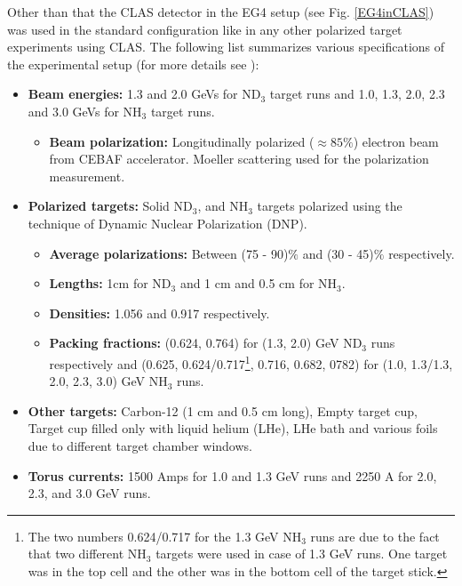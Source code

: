 Other than that the CLAS detector in the EG4 setup (see Fig. \ref{EG4inCLAS}) was used in the standard configuration like in any other polarized target experiments using CLAS. The following list summarizes various specifications of the experimental setup (for more details see \cite{anaNoteXZheng}):
\begin{itemize}
\item \textbf{Beam energies:} 1.3 and 2.0 GeVs for ND$_3$ target runs and 1.0, 1.3, 2.0, 2.3 and 3.0 GeVs for NH$_3$ target runs.
\begin{itemize}
\item \textbf{Beam polarization: } Longitudinally polarized ($\approx 85\%$) electron beam from CEBAF accelerator. Moeller scattering used for the polarization measurement.
\end{itemize}
\item \textbf{Polarized targets: } Solid ND$_3$, and NH$_3$ targets polarized using the technique of Dynamic Nuclear Polarization (DNP).
\begin{itemize}
\item \textbf{Average polarizations: } Between (75 - 90)$\%$ and  (30 - 45)$\%$ respectively.
\item \textbf{Lengths: } 1cm for ND$_3$ and 1 cm and 0.5 cm for  NH$_3$.
\item \textbf{Densities: } 1.056 and 0.917 respectively.
\item \textbf{Packing fractions: } (0.624, 0.764) for (1.3, 2.0) GeV  ND$_3$ runs respectively and (0.625, 0.624/0.717\footnote{The two numbers 0.624/0.717 for the 1.3 GeV NH$_3$ runs are due to the fact that two different NH$_3$ targets were used in case of 1.3 GeV runs. One target was in the top cell and the other was in the bottom cell of the target stick.}, 0.716, 0.682, 0782) for (1.0, 1.3/1.3, 2.0, 2.3, 3.0) GeV NH$_3$ runs.  
\end{itemize}  
\item \textbf{Other targets: } Carbon-12 (1 cm and 0.5 cm long), Empty target cup, Target cup filled only with liquid helium (LHe), LHe bath and various foils due to different target chamber windows. 
\item \textbf{Torus currents: } 1500 Amps for 1.0 and 1.3 GeV runs and 2250 A for 2.0, 2.3, and 3.0 GeV runs.
\end{itemize}  

